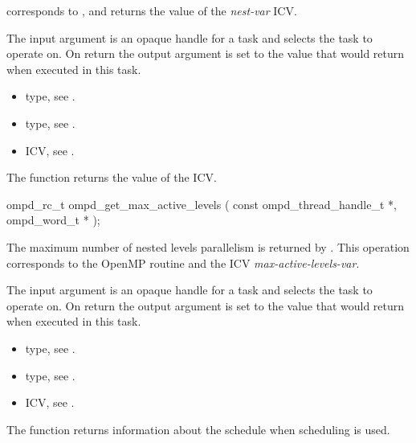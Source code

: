\descr
{} corresponds to ,
and returns the value of the \emph{nest-var} ICV.

\argdesc
The input argument  is an opaque handle for a task and selects the task to operate on.
On return the output argument  is set to the value that  would return when
executed in this task.

\crossreferences
\begin{itemize}
	\item {} type, see .
	\item {} type, see .
	\item {} ICV, see .
\end{itemize}


\label{ompd:ompd_get_max_active_levels}
\summary
The  function returns the value of the  ICV.

\format
\cspecificstart
\begin{ompSyntax}
ompd_rc_t ompd_get_max_active_levels (
  const ompd_thread_handle_t *,
  ompd_word_t *
);
\end{ompSyntax}
\cspecificend

\descr
The maximum number of nested levels parallelism is returned by
.
This operation corresponds to the OpenMP routine
and the ICV \emph{max-active-levels-var}.%

\argdesc
The input argument  is an opaque handle for a task and selects the task to operate on.
On return the output argument  is set to the value that  would return when
executed in this task.

\crossreferences
\begin{itemize}
	\item {} type, see .
	\item {} type, see .
	\item {} ICV, see .
\end{itemize}

\label{ompd:ompd_get_schedule}
\summary
The  function returns information about the schedule when  scheduling is used.

